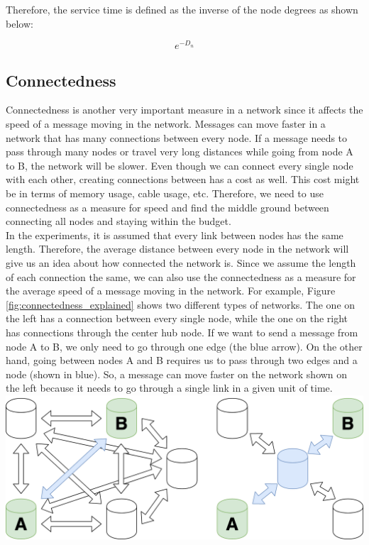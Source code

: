 \documentclass[journal]{IEEEtran}
\begin{document}
\noindent Therefore, the service time is defined as the inverse of the node degrees as shown below:

\begin{equation}
    e^{-D_n}
    \label{eq:service_time_eq}
\end{equation}

\subsection{Connectedness}
\noindent Connectedness is another very important measure in a network since it affects the speed of a message moving in the network. Messages can move faster in a network that has many connections between every node. If a message needs to pass through many nodes or travel very long distances while going from node A to B, the network will be slower. Even though we can connect every single node with each other, creating connections between has a cost as well. This cost might be in terms of memory usage, cable usage, etc. Therefore, we need to use connectedness as a measure for speed and find the middle ground between connecting all nodes and staying within the budget. \\

\noindent In the experiments, it is assumed that every link between nodes has the same length. Therefore, the average distance between every node in the network will give us an idea about how connected the network is. Since we assume the length of each connection the same, we can also use the connectedness as a measure for the average speed of a message moving in the network. For example, Figure \ref{fig:connectedness_explained} shows two different types of networks. The one on the left has a connection between every single node, while the one on the right has connections through the center hub node. If we want to send a message from node A to B, we only need to go through one edge (the blue arrow). On the other hand, going between nodes A and B requires us to pass through two edges and a node (shown in blue). So, a message can move faster on the network shown on the left because it needs to go through a single link in a given unit of time.\\

\begingroup
    \centering
    \bigskip
    \includegraphics[width=\columnwidth]{images/speed.png}
    \label{fig:connectedness_explained}
    \bigskip
\endgroup
\end{document}
